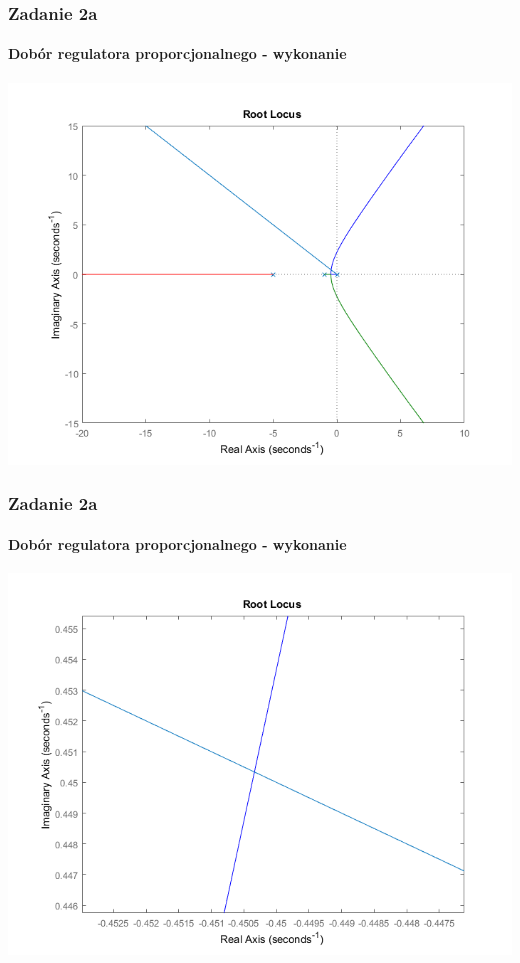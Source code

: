 \documentclass{beamer}
\begin{document}
\begin{frame}\frametitle{Zadanie 2a}\framesubtitle{Dobór regulatora proporcjonalnego - wykonanie}
\centering	\includegraphics[scale=0.5]{a-rlocus.png}
\end{frame}

\begin{frame}\frametitle{Zadanie 2a}\framesubtitle{Dobór regulatora proporcjonalnego - wykonanie}
\centering	\includegraphics[scale=0.5]{a-przyblizenie.png}
\end{frame}
\end{document}
